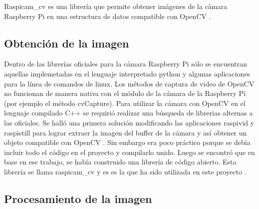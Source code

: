 Raspicam\_cv es una librería que permite obtener im\'agenes de la cámara Raspberry Pi en una estructura de datos compatible con OpenCV \cite{emilV}.

\subsection{Obtenci\'on de la imagen}\label{extraerImagen}

Dentro de las librerías oficiales para la cámara Raspberry Pi s\'olo se encuentran aquellas implemetadas en el lenguaje interpretado python y algunas aplicaciones para la línea de comandos de linux. Los métodos de captura de video de OpenCV no funcionan de manera nativa con el m\'odulo de la cámara de la Raspberry Pi (por ejemplo el método cvCapture). Para utilizar la cámara con OpenCV en el lenguaje compilado \gls{C++} se requirió realizar una búsqueda de librerias alternas a las oficiales. Se halló una primera solución modificando las aplicaciones \gls{raspivid} y \gls{raspistill} para lograr extraer la imagen del buffer de la cámara y así obtener un objeto compatible con OpenCV \cite{pierreR}. Sin embargo era poco práctico porque se debía incluir todo el código en el proyecto y compilarlo unido. Luego se encontró que en base en ese trabajo, se había construido una librería de código abierto. Esta librería se llama raspicam\_cv y es es la que ha sido utilizada en este proyecto \cite{emilV}.


\subsection{Procesamiento de la imagen}\label{procesarImagen}


